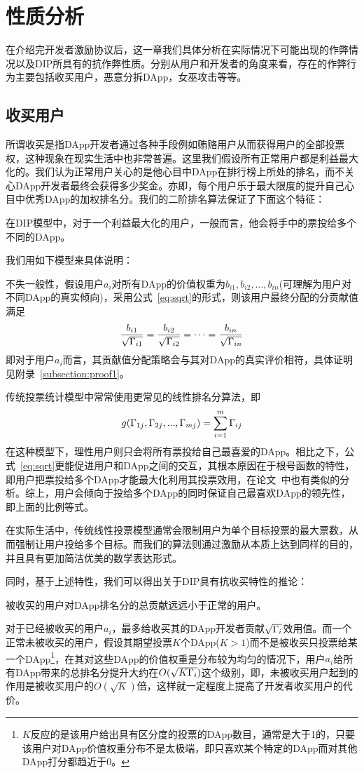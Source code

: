 \section{性质分析}
\label{section:properties}
在介绍完开发者激励协议后，这一章我们具体分析在实际情况下可能出现的作弊情况以及DIP所具有的抗作弊性质。分别从用户和开发者的角度来看，存在的作弊行为主要包括收买用户，恶意分拆DApp，女巫攻击等等。%

\subsection{收买用户}
所谓收买是指DApp开发者通过各种手段例如贿赂用户从而获得用户的全部投票权，这种现象在现实生活中也非常普遍。这里我们假设所有正常用户都是利益最大化的。我们认为正常用户关心的是他心目中DApp在排行榜上所处的排名，而不关心DApp开发者最终会获得多少奖金。亦即，每个用户乐于最大限度的提升自己心目中优秀DApp的加权排名分。我们的二阶排名算法保证了下面这个特征：

\begin{property}
	\label{p1}
	在DIP模型中，对于一个利益最大化的用户，一般而言，他会将手中的票投给多个不同的DApp。
\end{property}
我们用如下模型来具体说明：

不失一般性，假设用户$a_i$对所有DApp的价值权重为$b_{i1},b_{i2},...,b_{in}$(可理解为用户对不同DApp的真实倾向)，采用公式~\ref{eq:sqrt}的形式，则该用户最终分配的分贡献值满足
$$\frac{b_{i1}}{\sqrt{\Gamma_{i1}}}=\frac{b_{i2}}{\sqrt{\Gamma_{i2}}}=\cdots=\frac{b_{in}}{\sqrt{\Gamma_{in}}}$$
即对于用户$a_i$而言，其贡献值分配策略会与其对DApp的真实评价相符，具体证明见附录~\ref{subsection:proof1}。

传统投票统计模型中常常使用更常见的线性排名分算法，即
$$g(\Gamma_{1j},\Gamma_{2j},...,\Gamma_{mj}) = \sum_{i=1}^m \Gamma_{ij}$$
在这种模型下，理性用户则只会将所有票投给自己最喜爱的DApp。相比之下，公式~\ref{eq:sqrt}更能促进用户和DApp之间的交互，其根本原因在于根号函数的特性，即用户把票投给多个DApp才能最大化利用其投票效用，在论文~\cite{buterin2018liberal}中也有类似的分析。综上，用户会倾向于投给多个DApp的同时保证自己最喜欢DApp的领先性，即上面的比例等式。

在实际生活中，传统线性投票模型通常会限制用户为单个目标投票的最大票数，从而强制让用户投给多个目标。而我们的算法则通过激励从本质上达到同样的目的，并且具有更加简洁优美的数学表达形式。

同时，基于上述特性，我们可以得出关于DIP具有抗收买特性的推论：
\begin{corollary}
被收买的用户对DApp排名分的总贡献远远小于正常的用户。
\end{corollary}
对于已经被收买的用户$a_i$，最多给收买其的DApp开发者贡献$\sqrt{\Gamma_i}$效用值。而一个正常未被收买的用户，假设其期望投票$K$个DApp($K>1$)而不是被收买只投票给某一个DApp\footnote{$K$反应的是该用户给出具有区分度的投票的DApp数目，通常是大于1的，只要该用户对DApp价值权重分布不是太极端，即只喜欢某个特定的DApp而对其他DApp打分都趋近于0。}，在其对这些DApp的价值权重是分布较为均匀的情况下，用户$a_i$给所有DApp带来的总排名分提升大约在$O(\sqrt{K\Gamma_i})$这个级别，即，未被收买用户起到的作用是被收买用户的$O(\sqrt{K})$倍，这样就一定程度上提高了开发者收买用户的代价。

